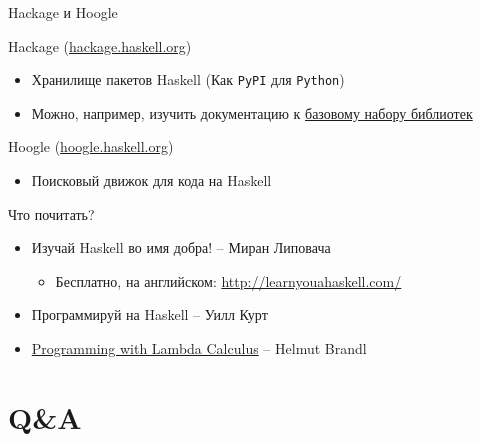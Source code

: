\documentclass{beamer}
\begin{document}
  \begin{frame}{Hackage и Hoogle}
      \begin{block}{Hackage (\url{hackage.haskell.org})}
        \begin{itemize}
            \item Хранилище пакетов Haskell (Как \texttt{PyPI} для \texttt{Python})
            \item Можно, например, изучить документацию к \alert{\href{https://hackage.haskell.org/package/base}{базовому набору библиотек}}
        \end{itemize}
      \end{block}
      \begin{block}{Hoogle (\url{hoogle.haskell.org})}
        \begin{itemize}
            \item Поисковый движок для кода на Haskell
        \end{itemize}
      \end{block}
  \end{frame}
  \begin{frame}{Что почитать?}
      \begin{itemize}
          \item Изучай Haskell во имя добра! -- Миран Липовача
          \begin{itemize}
              \item Бесплатно, на английском: \url{http://learnyouahaskell.com/}
          \end{itemize}
          \item Программируй на Haskell -- Уилл Курт
      \end{itemize}
      \begin{itemize}
          \item \alert{\href{https://hbr.github.io/Lambda-Calculus/lambda2/lambda.html}{Programming with Lambda Calculus}} -- Helmut Brandl
      \end{itemize}
  \end{frame}
  \section{Q\&A}
\end{document}
